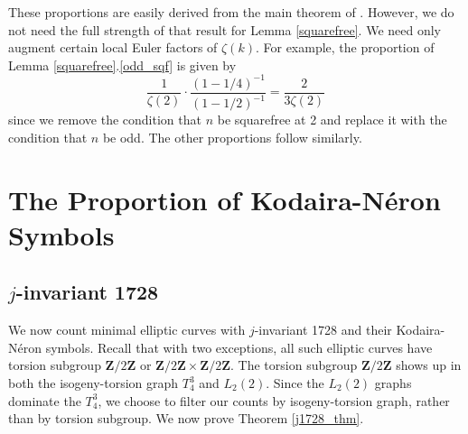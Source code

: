 \documentclass{amsart}
\newcommand{\Z}{\mathbf{Z}}
\numberwithin{equation}{section}
\theoremstyle{plain}
\theoremstyle{remark}
\begin{document}
These proportions are easily derived from the main theorem of \cite{integers_paper}.  However, we do not need the full strength of that result for Lemma \ref{squarefree}.  We need only augment certain local Euler factors of $\zeta(k)$.  For example, the proportion of Lemma \ref{squarefree}.\ref{odd_sqf} is given by 
\[
\frac{1}{\zeta(2)} \cdot \frac{\left(1-1/4 \right)^{-1}}{\left(1-1/2\right)^{-1}} = \frac{2}{3 \zeta(2)}
\]
since we remove the condition that $n$ be squarefree at 2 and replace it with the condition that $n$ be odd. The other proportions follow similarly. 

\section{The Proportion of Kodaira-N\'eron Symbols}

\subsection{$j$-invariant 1728} We now count minimal elliptic curves with $j$-invariant 1728 and their Kodaira-N\'eron symbols.  Recall that with two exceptions, all such elliptic curves have torsion subgroup $\Z/2\Z$ or $\Z/2\Z \times \Z/2\Z$.  The torsion subgroup $\Z/2\Z$ shows up in both the isogeny-torsion graph $T_4^3$ and $L_2(2)$.  Since the $L_2(2)$ graphs dominate the $T_4^3$, we choose to  filter our counts by isogeny-torsion graph, rather than by torsion subgroup.   We now prove Theorem \ref{j1728_thm}.
\end{document}

